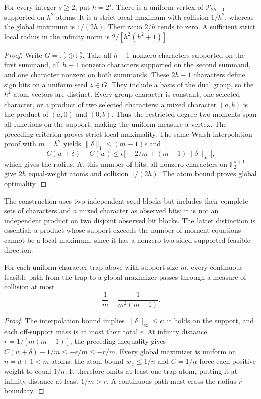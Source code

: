\begin{theorem}
\label{s13:thm:attainment-infinite-traps}
For every integer $s\ge2$, put $h=2^s$. There is a uniform vertex
of $\mathcal P_{2h-1}$ supported on $h^2$ atoms. It is a strict
local maximum with collision $1/h^2$, whereas the global maximum
is $1/(2h)$. Their ratio $2/h$ tends to zero. A sufficient strict
local radius in the infinity norm is $2/[h^2(h^2+1)]$.
\end{theorem}
\begin{proof}
Write $G=\mathbb F_2^s\oplus\mathbb F_2^s$. Take all $h-1$
nonzero characters supported on the first summand, all $h-1$
nonzero characters supported on the second summand, and one character
nonzero on both summands. These $2h-1$ characters define sign bits
on a uniform seed $z\in G$. They include a basis of the dual group,
so the $h^2$ atom vectors are distinct. Every group character is
constant, one selected character, or a product of two selected
characters: a mixed character $(a,b)$ is the product of $(a,0)$ and
$(0,b)$. Thus the restricted degree-two moments span all functions
on the support, making the uniform measure a vertex.
The preceding criterion proves strict local maximality. The same
Walsh interpolation proof with $m=h^2$ yields
$\|\delta\|_1\le(m+1)\epsilon$ and
\[
 C(w+\delta)-C(w)
 \le\epsilon\big[-2/m+(m+1)\|\delta\|_\infty\big],
\]
which gives the radius. At this number of bits, all nonzero characters
on $\mathbb F_2^{s+1}$ give $2h$ equal-weight atoms and collision
$1/(2h)$. The atom bound proves global optimality.
\end{proof}
The construction uses two independent seed blocks but includes their
complete sets of characters and a mixed character as observed bits;
it is not an independent product on two disjoint observed bit blocks.
The latter distinction is essential: a product whose support exceeds
the number of moment equations cannot be a local maximum, since it
has a nonzero two-sided supported feasible direction.

\begin{corollary}
\label{s13:cor:attainment-barrier}
For each uniform character trap above with support size $m$, every
continuous feasible path from the trap to a global maximizer passes
through a measure of collision at most
\[
 \frac1m-\frac1{m^2(m+1)}.
\]
\end{corollary}
\begin{proof}
The interpolation bound implies $\|\delta\|_\infty\le\epsilon$:
it holds on the support, and each off-support mass is at most their
total $\epsilon$. At infinity distance $r=1/[m(m+1)]$, the preceding
inequality gives $C(w+\delta)-1/m\le-\epsilon/m\le-r/m$.
Every global maximizer is uniform on $n=d+1<m$ atoms: the atom bound
$w_x\le1/n$ and $C=1/n$ force each positive weight to equal $1/n$.
It therefore omits at least one trap atom, putting it at infinity
distance at least $1/m>r$. A continuous path must cross the radius-$r$
boundary.
\end{proof}


